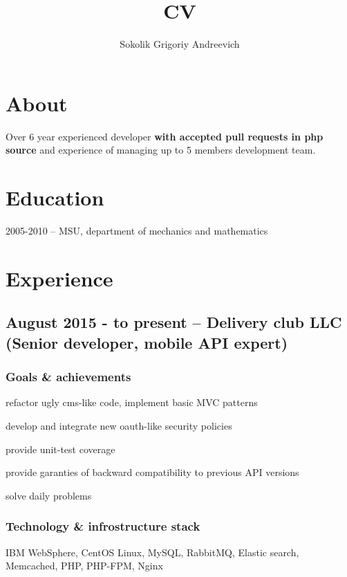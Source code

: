 \documentclass[9pt, a4paper, english]{extarticle}
\title {CV}
\author{Sokolik Grigoriy Andreevich}
\begin{document}
\maketitle

\section* {About}
Over 6 year experienced developer \textbf{with accepted pull requests in php source} and experience of managing up to 5 members development team.

\section* {Education}
2005-2010 -- MSU, department of mechanics and mathematics


\section* {Experience}
  \subsection* {August 2015 - to present -- \textbf{Delivery club LLC} (Senior developer, mobile API expert)}
    \subsubsection* {Goals \& achievements}
      \begin {list}{\textbullet}{\itemsep=0mm}
        \item refactor ugly cms-like code, implement basic MVC patterns
        \item develop and integrate new oauth-like security policies
        \item provide unit-test coverage
        \item provide garanties of backward compatibility to previous API versions
        \item solve daily problems
      \end{list}
    \subsubsection* {Technology \& infrostructure stack}
      IBM WebSphere, CentOS Linux, MySQL, RabbitMQ, Elastic search, Memcached,
      PHP, PHP-FPM, Nginx
\end{document}
